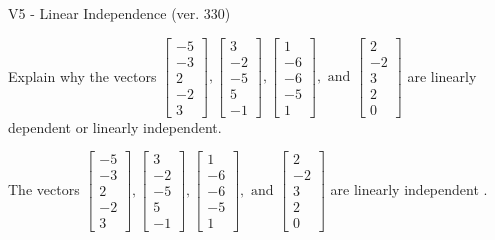 \begin{exercise}
  \begin{exerciseTitle}V5 - Linear Independence (ver. 330)\end{exerciseTitle}
  \begin{exerciseStatement}
    Explain why the vectors \(\left[\begin{array}{r}
-5 \\
-3 \\
2 \\
-2 \\
3
\end{array}\right] , \left[\begin{array}{r}
3 \\
-2 \\
-5 \\
5 \\
-1
\end{array}\right] , \left[\begin{array}{r}
1 \\
-6 \\
-6 \\
-5 \\
1
\end{array}\right] , \text{ and } \left[\begin{array}{r}
2 \\
-2 \\
3 \\
2 \\
0
\end{array}\right]\) are linearly dependent or linearly independent.	


  \end{exerciseStatement}
  \begin{exerciseAnswer}
   The vectors \(\left[\begin{array}{r}
-5 \\
-3 \\
2 \\
-2 \\
3
\end{array}\right] , \left[\begin{array}{r}
3 \\
-2 \\
-5 \\
5 \\
-1
\end{array}\right] , \left[\begin{array}{r}
1 \\
-6 \\
-6 \\
-5 \\
1
\end{array}\right] , \text{ and } \left[\begin{array}{r}
2 \\
-2 \\
3 \\
2 \\
0
\end{array}\right]\) are 
  	 linearly independent  .
  


  \end{exerciseAnswer}
\end{exercise}